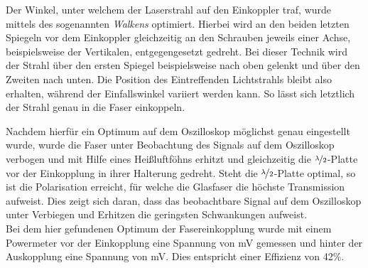 Der Winkel, unter welchem der Laserstrahl auf den Einkoppler traf, wurde mittels des sogenannten \textit{Walkens} optimiert. Hierbei wird an den beiden letzten Spiegeln vor dem Einkoppler gleichzeitig an den Schrauben jeweils einer Achse, beispielsweise der Vertikalen, entgegengesetzt gedreht. Bei dieser Technik wird der Strahl über den ersten Spiegel beispielsweise nach oben gelenkt und über den Zweiten nach unten. Die Position des Eintreffenden Lichtstrahls bleibt also erhalten, während der Einfallswinkel variiert werden kann. So lässt sich letztlich der Strahl genau in die Faser einkoppeln.

Nachdem hierfür ein Optimum auf dem Oszilloskop möglichst genau eingestellt wurde, wurde die Faser unter Beobachtung des Signals auf dem Oszilloskop verbogen und mit Hilfe eines Heißluftföhns erhitzt und gleichzeitig die $\nicefrac{\lambda}{2}$-Platte vor der Einkopplung in ihrer Halterung gedreht. Steht die $\nicefrac{\lambda}{2}$-Platte optimal, so ist die Polarisation erreicht, für welche die Glasfaser die höchste Transmission aufweist. Dies zeigt sich daran, dass das beobachtbare Signal auf dem Oszilloskop unter Verbiegen und Erhitzen die geringsten Schwankungen aufweist. \\
Bei dem hier gefundenen Optimum der Fasereinkopplung wurde mit einem Powermeter vor der Einkopplung eine Spannung von \unit[420]{mV} gemessen und hinter der Auskopplung eine Spannung von \unit[244]{mV}. Dies entspricht einer Effizienz von 42\%. 

